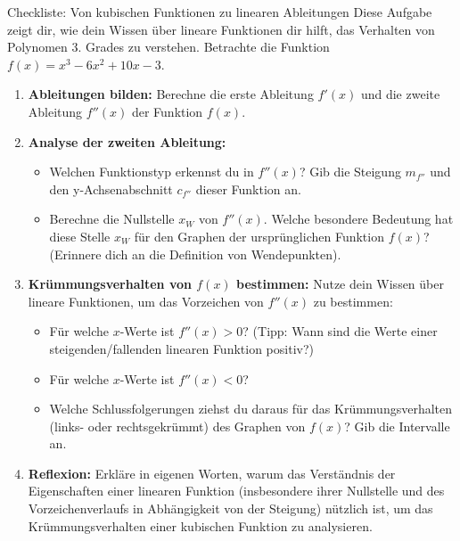 \begin{aufgabenumgebung}{Checkliste: Von kubischen Funktionen zu linearen Ableitungen}
Diese Aufgabe zeigt dir, wie dein Wissen über lineare Funktionen dir hilft, das Verhalten von Polynomen 3. Grades zu verstehen.
Betrachte die Funktion $f(x) = x^3 - 6x^2 + 10x - 3$.

\begin{enumerate}[label=(\alph*)]
    \item \textbf{Ableitungen bilden:} Berechne die erste Ableitung $f'(x)$ und die zweite Ableitung $f''(x)$ der Funktion $f(x)$.
    \item \textbf{Analyse der zweiten Ableitung:}
    \begin{itemize}
        \item Welchen Funktionstyp erkennst du in $f''(x)$? Gib die Steigung $m_{f''}$ und den y-Achsenabschnitt $c_{f''}$ dieser Funktion an.
        \item Berechne die Nullstelle $x_W$ von $f''(x)$. Welche besondere Bedeutung hat diese Stelle $x_W$ für den Graphen der ursprünglichen Funktion $f(x)$? (Erinnere dich an die Definition von Wendepunkten).
    \end{itemize}
    \item \textbf{Krümmungsverhalten von $f(x)$ bestimmen:}
    Nutze dein Wissen über lineare Funktionen, um das Vorzeichen von $f''(x)$ zu bestimmen:
    \begin{itemize}
        \item Für welche $x$-Werte ist $f''(x) > 0$? (Tipp: Wann sind die Werte einer steigenden/fallenden linearen Funktion positiv?)
        \item Für welche $x$-Werte ist $f''(x) < 0$?
        \item Welche Schlussfolgerungen ziehst du daraus für das Krümmungsverhalten (links- oder rechtsgekrümmt) des Graphen von $f(x)$? Gib die Intervalle an.
    \end{itemize}
    \item \textbf{Reflexion:} Erkläre in eigenen Worten, warum das Verständnis der Eigenschaften einer linearen Funktion (insbesondere ihrer Nullstelle und des Vorzeichenverlaufs in Abhängigkeit von der Steigung) nützlich ist, um das Krümmungsverhalten einer kubischen Funktion zu analysieren.
\end{enumerate}
\end{aufgabenumgebung}


